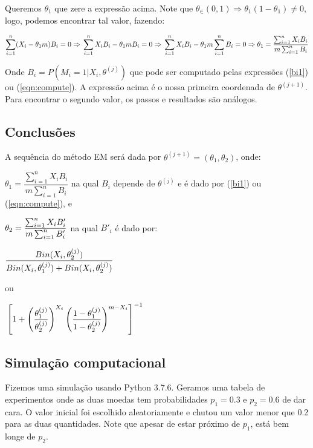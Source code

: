\documentclass[12pt]{article}
\begin{document}
Queremos $\theta_1$ que zere a expressão acima. Note que $\theta_\in(0,1)\Rightarrow \theta_1(1-\theta_1)\neq0$, logo, podemos encontrar tal valor, fazendo:

$\displaystyle\sum_{i=1}^n (X_i-\theta_1 m)B_i=0\Rightarrow\\
\displaystyle\sum_{i=1}^n X_iB_i-\theta_1 m B_i=0\Rightarrow\\
\displaystyle\sum_{i=1}^n X_iB_i-\theta_1 m\displaystyle\sum_{i=1}^nB_i=0\Rightarrow\\
\theta_1=\dfrac{\sum_{i=1}^nX_iB_i}{m\sum_{i=1}^nB_i}$

Onde $B_i=P(M_i=1|X_i,\theta^{(j)})$ que pode ser computado pelas expressões (\ref{bi1}) ou (\ref{eqn:compute}). A expressão acima é o nossa primeira coordenada de $\theta^{(j+1)}$. Para encontrar o segundo valor, os passos e resultados são análogos.


\subsection{Conclusões}

A sequência do método EM será dada por $\theta^{(j+1)}=(\theta_1,\theta_2)$, onde:

$\theta_1=\dfrac{\sum_{i=1}^nX_iB_i}{m\sum_{i=1}^nB_i}$ na qual $B_i$ depende de $\theta^{(j)}$ e é dado por (\ref{bi1}) ou (\ref{eqn:compute}), e

$\\ \theta_2=\dfrac{\sum_{i=1}^nX_iB'_i}{m\sum_{i=1}^nB'_i}$ na qual $B'_i$ é dado por:

$\\ \dfrac{Bin(X_i,\theta_2^{(j)})}{Bin(X_i,\theta_1^{(j)})+Bin(X_i,\theta_2^{(j)})}\\$

ou 

$\\ \left[1+\left(\dfrac{\theta_1^{(j)}}{\theta_2^{(j)}}\right)^{X_i}\left(\dfrac{1-\theta_1^{(j)}}{1-\theta_2^{(j)}}\right)^{m-X_i}\right]^{-1}$


\subsection{Simulação computacional}

Fizemos uma simulação usando Python 3.7.6. Geramos uma tabela de experimentos onde as duas moedas tem probabilidades $p_1=0.3$ e $p_2=0.6$ de dar cara. O valor inicial foi escolhido aleatoriamente e chutou um valor menor que 0.2 para as duas quantidades. Note que apesar de estar próximo de $p_1$, está bem longe de $p_2$.
\end{document}
